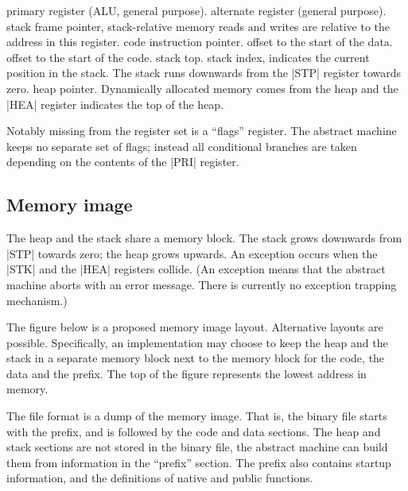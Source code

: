 \beginlist{30pt}\compactlist
{} primary register (ALU, general purpose).
 alternate register (general purpose).
 stack frame pointer, stack-relative memory reads and writes
  are relative to the address in this register.
 code instruction pointer.
 offset to the start of the data.
 offset to the start of the code.
 stack top.
 stack index, indicates the current position in the stack. The
  stack runs downwards from the |STP| register towards zero.
 heap pointer. Dynamically allocated memory comes from the
  heap and the |HEA| register indicates the top of the heap.
\endlist

Notably missing from the register set is a ``flags'' register. The abstract
machine keeps no separate set of flags; instead all conditional branches are
taken depending on the contents of the |PRI| register.

\subsection{Memory image}
The heap and the stack share a memory block. The stack grows downwards from
|STP| towards zero; the heap grows upwards. An exception occurs when the
|STK| and the |HEA| registers collide. (An exception means that the abstract machine aborts
with an error message. There is currently no exception trapping mechanism.)

The figure below is a proposed memory image layout. Alternative layouts are
possible. %
Specifically, an implementation may choose to keep the heap and
the stack in a separate memory block next to the memory block for the code,
the data and the prefix. The top of the figure represents the lowest address
in memory.

The file format is a dump of the memory image. That
is, the binary file starts with the prefix, and is followed by the code and
data sections. The heap and stack sections are not stored in the binary file,
the abstract machine can build them from information in the ``prefix'' section. The prefix
also contains startup information, and the definitions of native and
public functions.


